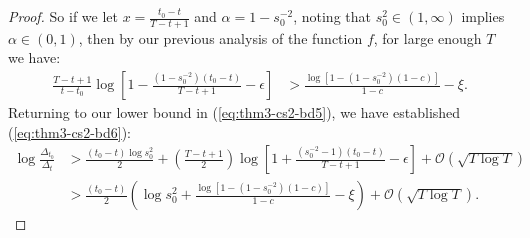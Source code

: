 \begin{proof}
So if we let $x = \frac{t_0 - t}{T - t + 1}$ and $\alpha = 1 - s_0^{-2}$, noting that $s_0^{2} \in (1,\infty)$ implies $\alpha \in (0,1)$, then by our previous analysis of the function $f$, for large enough $T$ we have:
\begin{align*}
    \frac{T-t+1}{t-t_0}\log\left[1 - \frac{\left(1- s_0^{-2}\right)(t_0 - t)}{T - t + 1} - \epsilon\right] &> \frac{\log[1 -  (1 -s_0^{-2})(1-c)]}{1-c} - \xi.
\end{align*}
Returning to our lower bound in (\ref{eq:thm3-cs2-bd5}), we have established (\ref{eq:thm3-cs2-bd6}):
\begin{align*}
    \log \frac{\Delta_{t_0}}{\Delta_t} &> \frac{(t_0 - t)\log s_0^2}{2} + \left(\frac{T - t + 1}{2}\right)\log\left[1 + \frac{\left(s_0^{-2} -1\right)(t_0 - t)}{T - t + 1} - \epsilon\right] + \mathcal{O}(\sqrt{T \log T}) \\
    &> \frac{(t_0 - t)}{2} \left(\log s_0^2 + \frac{\log[1 -  (1 - s_0^{-2})(1-c)]}{1-c} - \xi\right)  + \mathcal{O}(\sqrt{T \log T}).
\end{align*}


\end{proof}
